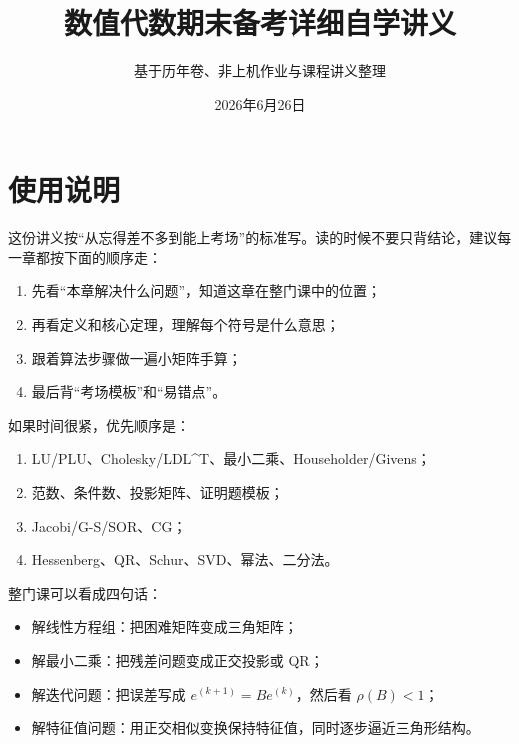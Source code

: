 \documentclass[11pt,a4paper]{ctexart}
\title{\bfseries 数值代数期末备考详细自学讲义}
\author{基于历年卷、非上机作业与课程讲义整理}
\date{2026年6月26日}
\begin{document}
\maketitle
\tableofcontents
\newpage


\section*{使用说明}


这份讲义按“从忘得差不多到能上考场”的标准写。读的时候不要只背结论，建议每一章都按下面的顺序走：

\begin{enumerate}

\item 先看“本章解决什么问题”，知道这章在整门课中的位置；

\item 再看定义和核心定理，理解每个符号是什么意思；

\item 跟着算法步骤做一遍小矩阵手算；

\item 最后背“考场模板”和“易错点”。

\end{enumerate}

如果时间很紧，优先顺序是：

\begin{enumerate}

\item LU/PLU、Cholesky/LDL\textasciicircum{}T、最小二乘、Householder/Givens；

\item 范数、条件数、投影矩阵、证明题模板；

\item Jacobi/G-S/SOR、CG；

\item Hessenberg、QR、Schur、SVD、幂法、二分法。

\end{enumerate}

整门课可以看成四句话：

\begin{itemize}

\item 解线性方程组：把困难矩阵变成三角矩阵；

\item 解最小二乘：把残差问题变成正交投影或 QR；

\item 解迭代问题：把误差写成 $e^{(k+1)}=Be^{(k)}$，然后看 $\rho(B)<1$；

\item 解特征值问题：用正交相似变换保持特征值，同时逐步逼近三角形结构。

\end{itemize}
\end{document}
